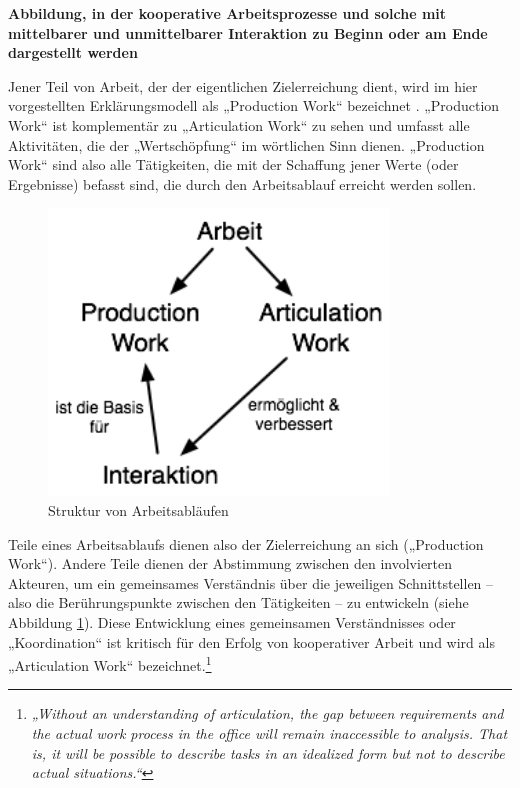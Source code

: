 \textbf{Abbildung, in der kooperative Arbeitsprozesse und solche mit mittelbarer und unmittelbarer Interaktion zu Beginn oder am Ende dargestellt werden}

Jener Teil von Arbeit, der der eigentlichen Zielerreichung dient, wird im hier vorgestellten Erklärungsmodell als „Production Work“ bezeichnet \citep{Fujimura87}. „Production Work“ ist komplementär zu „Articulation Work“ zu sehen und umfasst alle Aktivitäten, die der „Wertschöpfung“ im wörtlichen Sinn dienen. „Production Work“ sind also alle Tätigkeiten, die mit der Schaffung jener Werte (oder Ergebnisse) befasst sind, die durch den Arbeitsablauf erreicht werden sollen.  

\begin{figure}[htbp]
	\centering
		\includegraphics[height=3in]{img/ArticulationWork/ArbeitInteraktion.png}
	\caption{Struktur von Arbeitsabläufen}
	\label{fig:img_ArticulationWork_ArbeitInteraktion}
\end{figure}

Teile eines Arbeitsablaufs dienen also der Zielerreichung an sich („Production Work“). Andere Teile dienen der Abstimmung zwischen den involvierten Akteuren, um ein gemeinsames Verständnis über die jeweiligen Schnittstellen – also die Berührungspunkte zwischen den Tätigkeiten – zu entwickeln (siehe Abbildung \ref{fig:img_ArticulationWork_ArbeitInteraktion}). Diese Entwicklung eines gemeinsamen Verständnisses oder „Koordination“ ist kritisch für den Erfolg von kooperativer Arbeit \citep{Strauss93} und wird als „Articulation Work“ bezeichnet.\footnote{\emph{„Without an understanding of articulation, the gap between requirements and the actual work process in the office will remain inaccessible to analysis. That is, it will be possible to describe tasks in an idealized form but not to describe actual situations.“}\citep{Gerson86}} 

